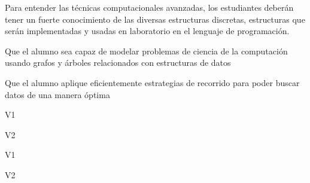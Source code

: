 \begin{syllabus}


\begin{justification}
Para entender las técnicas computacionales avanzadas, los estudiantes deberán tener un fuerte conocimiento de las
diversas estructuras discretas, estructuras que serán implementadas y usadas en laboratorio en el lenguaje de programación.
\end{justification}

\begin{goals}
\item Que el alumno sea capaz de modelar problemas de ciencia de la computación usando grafos y árboles relacionados con estructuras de datos
\item Que el alumno aplique eficientemente estrategias de recorrido para poder buscar datos de una manera óptima
\end{goals}

\begin{outcomes}{V1}
    \item {}
    \item {}	
    \item {}
\end{outcomes}

\begin{outcomes}{V2}
    \item {}
    \item {}	
    \item {}
\end{outcomes}

\begin{competences}{V1}
    \item {}
    \item {}
    \item {}
\end{competences}

\begin{competences}{V2}
    \item {}
    \item {}
    \item {}
\end{competences}


\end{syllabus}
